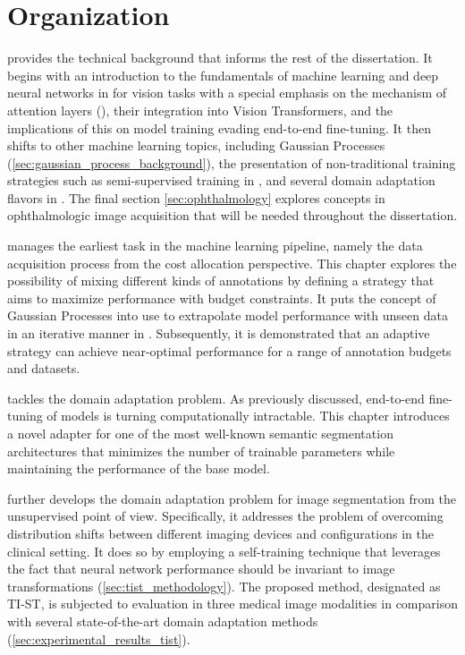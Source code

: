 \section{Organization}
 provides the technical background that informs the rest of the dissertation. It begins with an introduction to the fundamentals of machine learning and deep neural networks in  for vision tasks with a special emphasis on the mechanism of attention layers (), their integration into Vision Transformers, and the implications of this on model training evading end-to-end fine-tuning. It then shifts to other machine learning topics, including Gaussian Processes (\cref{sec:gaussian_process_background}), the presentation of non-traditional training strategies such as semi-supervised training in , and several domain adaptation flavors in . The final section \cref{sec:ophthalmology} explores concepts in ophthalmologic image acquisition that will be needed throughout the dissertation.

 manages the earliest task in the machine learning pipeline, namely the data acquisition process from the cost allocation perspective. This chapter explores the possibility of mixing different kinds of annotations by defining a strategy that aims to maximize performance with budget constraints. It puts the concept of Gaussian Processes into use to extrapolate model performance with unseen data in an iterative manner in . Subsequently, it is demonstrated that an adaptive strategy can achieve near-optimal performance for a range of annotation budgets and datasets.

 tackles the domain adaptation problem. As previously discussed, end-to-end fine-tuning of models is turning computationally intractable. This chapter introduces a novel adapter for one of the most well-known semantic segmentation architectures that minimizes the number of trainable parameters while maintaining the performance of the base model. 

 further develops the domain adaptation problem for image segmentation from the unsupervised point of view. Specifically, it addresses the problem of overcoming distribution shifts between different imaging devices and configurations in the clinical setting. It does so by employing a self-training technique that leverages the fact that neural network performance should be invariant to image transformations (\cref{sec:tist_methodology}). The proposed method, designated as TI-ST, is subjected to evaluation in three medical image modalities in comparison with several state-of-the-art domain adaptation methods (\cref{sec:experimental_results_tist}).

